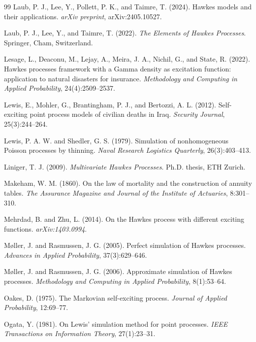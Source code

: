 \documentclass[12pt,a4paper]{report}
\theoremstyle{plain}
\theoremstyle{definition}
\theoremstyle{remark}
\newcommand{\1}{\mathbf{1}}
\begin{document}
\begin{thebibliography}{99}
Laub, P. J., Lee, Y., Pollett, P. K., and Taimre, T. (2024).
\newblock Hawkes models and their applications.
\newblock \emph{arXiv preprint}, arXiv:2405.10527.

Laub, P. J., Lee, Y., and Taimre, T. (2022).
\newblock \emph{The Elements of Hawkes Processes}.
\newblock Springer, Cham, Switzerland.

Lesage, L., Deaconu, M., Lejay, A., Meira, J. A., Nichil, G., and State, R. (2022).
\newblock Hawkes processes framework with a Gamma density as excitation function: application to natural disasters for insurance.
\newblock \emph{Methodology and Computing in Applied Probability}, 24(4):2509--2537.

Lewis, E., Mohler, G., Brantingham, P. J., and Bertozzi, A. L. (2012).
\newblock Self-exciting point process models of civilian deaths in Iraq.
\newblock \emph{Security Journal}, 25(3):244--264.

Lewis, P. A. W. and Shedler, G. S. (1979).
\newblock Simulation of nonhomogeneous Poisson processes by thinning.
\newblock \emph{Naval Research Logistics Quarterly}, 26(3):403--413.

Liniger, T. J. (2009).
\newblock \emph{Multivariate Hawkes Processes}.
\newblock Ph.D. thesis, ETH Zurich.

Makeham, W. M. (1860).
\newblock On the law of mortality and the construction of annuity tables.
\newblock \emph{The Assurance Magazine and Journal of the Institute of Actuaries}, 8:301--310.

Mehrdad, B. and Zhu, L. (2014).
\newblock On the Hawkes process with different exciting functions.
\newblock \emph{arXiv:1403.0994}.

M{\o}ller, J. and Rasmussen, J. G. (2005).
\newblock Perfect simulation of Hawkes processes.
\newblock \emph{Advances in Applied Probability}, 37(3):629--646.

M{\o}ller, J. and Rasmussen, J. G. (2006).
\newblock Approximate simulation of Hawkes processes.
\newblock \emph{Methodology and Computing in Applied Probability}, 8(1):53--64.

Oakes, D. (1975).
\newblock The Markovian self-exciting process.
\newblock \emph{Journal of Applied Probability}, 12:69--77.

Ogata, Y. (1981).
\newblock On Lewis' simulation method for point processes.
\newblock \emph{IEEE Transactions on Information Theory}, 27(1):23--31.


\end{thebibliography}
\end{document}
